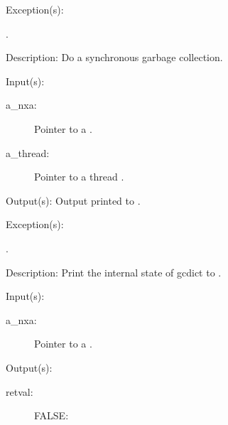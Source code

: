 \begin{capi}
\begin{capilist}
	\item[Exception(s): ]
		\begin{description}\item[]
		\item[.]
		\end{description}
	\item[Description: ]
		Do a synchronous garbage collection.
	\end{capilist}
\label{nxa_dump}
	\begin{capilist}
	\item[Input(s): ]
		\begin{description}\item[]
		\item[a\_nxa: ]
			Pointer to a .
		\item[a\_thread: ]
			Pointer to a thread .
		\end{description}
	\item[Output(s): ]
		Output printed to .
	\item[Exception(s): ]
		\begin{description}\item[]
		\item[.]
		\end{description}
	\item[Description: ]
		Print the internal state of gcdict to .
	\end{capilist}
\label{nxa_active_get}
	\begin{capilist}
	\item[Input(s): ]
		\begin{description}\item[]
		\item[a\_nxa: ]
			Pointer to a \classname{nxa}.
		\end{description}
	\item[Output(s): ]
		\begin{description}\item[]
		\item[retval: ]
			\begin{description}\item[]
			\item[FALSE: ]

\end{description}
\end{description}
\end{capilist}
\end{capi}

